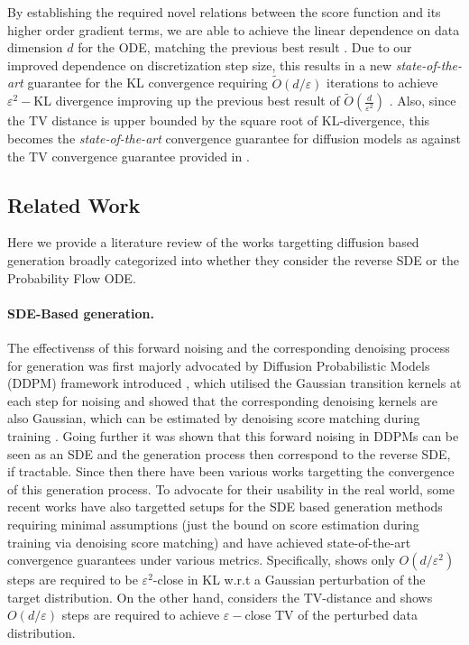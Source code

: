 \documentclass{article}
\begin{document}
By establishing the required novel relations between the score function and its higher order gradient terms, we are able to achieve the linear dependence on data dimension $d$ for the ODE, matching the previous best result \cite{benton2023nearly}. Due to our improved dependence on discretization step size, this results in a new \textit{state-of-the-art} guarantee for the KL convergence requiring $\tilde{O}(d/\varepsilon)$ iterations to achieve $\varepsilon^2-$KL divergence improving up the previous best result of $\tilde{O}(\tfrac{d}{\varepsilon^2})$ \cite{benton2023nearly}. Also, since the TV distance is upper bounded by the square root of KL-divergence, this becomes the \textit{state-of-the-art} convergence guarantee for diffusion models as against the TV convergence guarantee provided in \cite{li2024d}.


\subsection{Related Work}
\noindent
Here we provide a literature review of the works targetting diffusion based generation broadly categorized into whether they consider the reverse SDE or the Probability Flow ODE. 
\paragraph{SDE-Based generation.} The effectivenss of this forward noising and the corresponding denoising process for generation was first majorly advocated by 
 Diffusion Probabilistic Models (DDPM) framework introduced \cite{ho2020denoising}, which utilised the Gaussian transition kernels at each step for noising and showed that the corresponding denoising kernels are also Gaussian, which can be estimated by denoising score matching during training \cite{ho2020denoising}. Going further it was shown that this forward noising in DDPMs can be seen as an SDE \cite{song2020score} and the generation process then correspond to the reverse SDE, if tractable. Since then there have been various works \cite{chen2022sampling,li2023towards, li2024towards, lee2022convergence} targetting the convergence of this generation process. To advocate for their usability in the real world, some recent works \cite{chen2023improved, benton2023nearly, li2024d} have also targetted setups for the SDE based generation methods requiring minimal assumptions (just the bound on score estimation during training via denoising score matching) and have achieved state-of-the-art convergence guarantees under various metrics. Specifically, \cite{benton2023nearly} shows only $O(d/\varepsilon^2)$ steps are required to be $\varepsilon^2$-close in KL w.r.t a Gaussian perturbation of the target distribution. On the other hand, \cite{li2024d} considers the TV-distance and shows $O(d/\varepsilon)$ steps are required to achieve $\varepsilon-$close TV of the perturbed data distribution.
\end{document}
